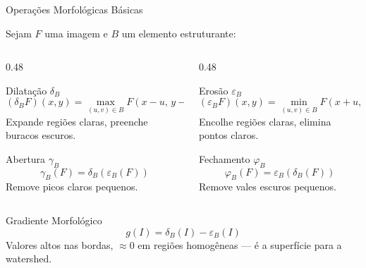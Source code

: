 \documentclass[aspectratio=169,12pt]{beamer}
\begin{document}
\begin{frame}{Opera\c{c}\~oes Morfol\'ogicas B\'asicas}

Sejam $F$ uma imagem e $B$ um elemento estruturante:

\begin{columns}[T]
\begin{column}{0.48\textwidth}
\begin{block}{Dilata\c{c}\~ao $\delta_B$}
\[
  (\delta_B F)(x,y) = \max_{(u,v)\in B} F(x-u,\,y-v)
\]
Expande regi\~oes claras, preenche buracos escuros.
\end{block}

\begin{block}{Abertura $\gamma_B$}
\[
  \gamma_B(F) = \delta_B(\varepsilon_B(F))
\]
Remove picos claros pequenos.
\end{block}
\end{column}
\begin{column}{0.48\textwidth}
\begin{block}{Eros\~ao $\varepsilon_B$}
\[
  (\varepsilon_B F)(x,y) = \min_{(u,v)\in B} F(x+u,\,y+v)
\]
Encolhe regi\~oes claras, elimina pontos claros.
\end{block}

\begin{block}{Fechamento $\varphi_B$}
\[
  \varphi_B(F) = \varepsilon_B(\delta_B(F))
\]
Remove vales escuros pequenos.
\end{block}
\end{column}
\end{columns}

\vspace{0.4cm}

\begin{exampleblock}{Gradiente Morfol\'ogico}
\[
  g(I) = \delta_B(I) - \varepsilon_B(I)
\]
Valores altos nas bordas, $\approx 0$ em regi\~oes homog\^eneas --- \'e a superf\'icie para a watershed.
\end{exampleblock}

\end{frame}
\end{document}
